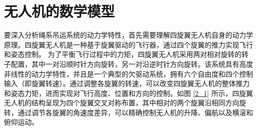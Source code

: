 \documentclass[lang=chs, degree=master, blindreview=false, winfonts=true]{yanputhesis}
\begin{document}
\section{无人机的数学模型}
要深入分析绳系吊运系统的动力学特性，首先需要理解四旋翼无人机自身的动力学原理。四旋翼无人机是一种基于旋翼驱动的飞行器，通过四个旋翼的推力实现飞行和姿态控制。
为了平衡飞行过程中的力矩，四旋翼无人机采用两对相对旋转的转子配置，其中一对沿顺时针方向旋转，另一对沿逆时针方向旋转。该系统具有高度非线性的动力学特性，并且是一个典型的欠驱动系统，拥有六个自由度和四个控制输入（即旋翼转速）。通过调整各旋翼的转速，可以改变四旋翼无人机的整体推力和姿态力矩，进而实现对飞行高度、位置和方向的控制。如图 \ref{2_1} 所示，四旋翼无人机的结构呈现为四个旋翼交叉对称布置，其中相对的两个旋翼沿相同方向旋转，通过调节各旋翼的角速度差异，可以精确控制无人机的升降、偏航以及横滚和俯仰运动。
\end{document}
